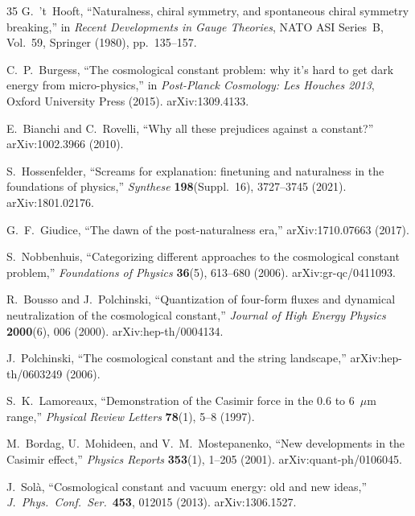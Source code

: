 \documentclass[11pt,a4paper]{article}
\theoremstyle{plain}
\theoremstyle{definition}
\begin{document}
\begin{thebibliography}{35}
G.~'t~Hooft,
``Naturalness, chiral symmetry, and spontaneous chiral symmetry breaking,''
in \emph{Recent Developments in Gauge Theories},
NATO ASI Series~B, Vol.~59, Springer (1980), pp.~135--157.

C.~P.~Burgess,
``The cosmological constant problem: why it's hard to get dark energy
from micro-physics,''
in \emph{Post-Planck Cosmology: Les Houches 2013},
Oxford University Press (2015).
arXiv:1309.4133.

E.~Bianchi and C.~Rovelli,
``Why all these prejudices against a constant?''
arXiv:1002.3966 (2010).

S.~Hossenfelder,
``Screams for explanation: finetuning and naturalness in the foundations
of physics,''
\emph{Synthese} \textbf{198}(Suppl.~16), 3727--3745 (2021).
arXiv:1801.02176.

G.~F.~Giudice,
``The dawn of the post-naturalness era,''
arXiv:1710.07663 (2017).

S.~Nobbenhuis,
``Categorizing different approaches to the cosmological constant problem,''
\emph{Foundations of Physics} \textbf{36}(5), 613--680 (2006).
arXiv:gr-qc/0411093.

R.~Bousso and J.~Polchinski,
``Quantization of four-form fluxes and dynamical neutralization
of the cosmological constant,''
\emph{Journal of High Energy Physics} \textbf{2000}(6), 006 (2000).
arXiv:hep-th/0004134.

J.~Polchinski,
``The cosmological constant and the string landscape,''
arXiv:hep-th/0603249 (2006).

S.~K.~Lamoreaux,
``Demonstration of the Casimir force in the 0.6 to 6~$\mu$m range,''
\emph{Physical Review Letters} \textbf{78}(1), 5--8 (1997).

M.~Bordag, U.~Mohideen, and V.~M.~Mostepanenko,
``New developments in the Casimir effect,''
\emph{Physics Reports} \textbf{353}(1), 1--205 (2001).
arXiv:quant-ph/0106045.

J.~Sol\`{a},
``Cosmological constant and vacuum energy: old and new ideas,''
\emph{J.\ Phys.\ Conf.\ Ser.}\ \textbf{453}, 012015 (2013).
arXiv:1306.1527.

\end{thebibliography}
\end{document}
